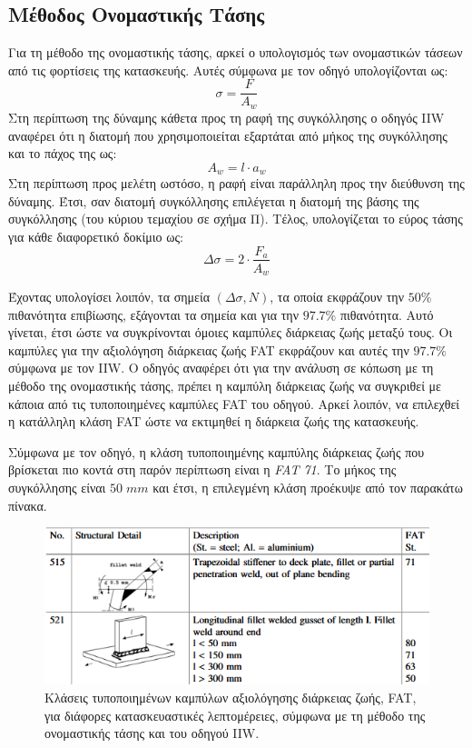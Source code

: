 \documentclass{article}
\begin{document}
\subsection{Μέθοδος Ονομαστικής Τάσης}
Για τη μέθοδο της ονομαστικής τάσης, αρκεί ο υπολογισμός των ονομαστικών τάσεων από τις φορτίσεις της κατασκευής. Αυτές σύμφωνα με τον οδηγό υπολογίζονται ως:
\begin{equation}
    \sigma = \frac{F}{A_w}
\end{equation}
Στη περίπτωση της δύναμης κάθετα προς τη ραφή της συγκόλλησης ο οδηγός IIW αναφέρει ότι η διατομή που χρησιμοποιείται εξαρτάται από μήκος της συγκόλλησης και το πάχος της ως:
\begin{equation}
    A_w = l\cdot a_w
\end{equation}
Στη περίπτωση προς μελέτη ωστόσο, η ραφή είναι παράλληλη προς την διεύθυνση της δύναμης. Έτσι, σαν διατομή συγκόλλησης επιλέγεται η διατομή της βάσης της συγκόλλησης (του κύριου τεμαχίου σε σχήμα Π). Τέλος, υπολογίζεται το εύρος τάσης για κάθε διαφορετικό δοκίμιο ως:
\begin{equation}
    \Delta \sigma = 2\cdot \frac{F_a}{A_w}
\end{equation}

Έχοντας υπολογίσει λοιπόν, τα σημεία $(\Delta \sigma, N)$, τα οποία εκφράζουν την $50\%$ πιθανότητα επιβίωσης, εξάγονται τα σημεία και για την $97.7\%$ πιθανότητα. Αυτό γίνεται, έτσι ώστε να συγκρίνονται όμοιες καμπύλες διάρκειας ζωής μεταξύ τους. Οι καμπύλες για την αξιολόγηση διάρκειας ζωής FAT εκφράζουν και αυτές την $97.7\%$ σύμφωνα με τον IIW. Ο οδηγός αναφέρει ότι για την ανάλυση σε κόπωση με τη μέθοδο της ονομαστικής τάσης, πρέπει η καμπύλη διάρκειας ζωής να συγκριθεί με κάποια από τις τυποποιημένες καμπύλες FAT του οδηγού. Αρκεί λοιπόν, να επιλεχθεί η κατάλληλη κλάση FAT ώστε να εκτιμηθεί η διάρκεια ζωής της κατασκευής.
\par Σύμφωνα με τον οδηγό, η κλάση τυποποιημένης καμπύλης διάρκειας ζωής που βρίσκεται πιο κοντά στη παρόν περίπτωση είναι η \textit{FAT 71}. Το μήκος της συγκόλλησης είναι $50\; mm$ και έτσι, η επιλεγμένη κλάση προέκυψε από τον παρακάτω πίνακα.
\begin{figure}[H]
    \centering
    \includegraphics[width = 0.5\linewidth]{media/fatnom.png}
    \caption{Κλάσεις τυποποιημένων καμπύλων αξιολόγησης διάρκειας ζωής, FAT, για διάφορες κατασκευαστικές λεπτομέρειες, σύμφωνα με τη μέθοδο της ονομαστικής τάσης και του οδηγού IIW.}
\end{figure}
\end{document}
